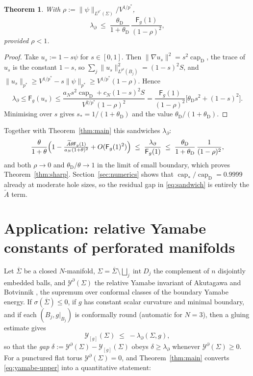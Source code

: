 \documentclass[11pt,reqno]{amsart}
\theoremstyle{plain}
\newtheorem{theorem}{Theorem}[section]
\theoremstyle{definition}
\newcommand{\aN}{a_N}
\newcommand{\cN}{c_N}
\newcommand{\pstar}{p^{*}}
\newcommand{\psharp}{p^{\sharp}}
\newcommand{\cpstar}{\operatorname{cap}_{*}}
\newcommand{\Fq}{\mathsf{F}}
\newcommand{\Y}{\mathcal{Y}}
\newcommand{\Yb}{\mathcal{Y}^{\partial}}
\newcommand{\Atil}{\widetilde{A}}
\begin{document}
\begin{theorem}
\label{thm:upper}
With $\rho:=\|\psi\|_{L^{\pstar}(\Sigma)}/V^{1/\pstar}$,
\[
  \lambda_\partial\;\le\;\frac{\theta_{\mathrm D}}{1+\theta_{\mathrm D}}\,
      \frac{\Fq_g(1)}{(1-\rho)^{2}} ,
\]
provided $\rho<1$.
\end{theorem}

\begin{proof}
Take $u_s:=1-s\psi$ for $s\in[0,1]$. Then
$\|\nabla u_s\|^2=s^2\operatorname{cap}_{\mathrm D}$, the trace of $u_s$ is the
constant $1-s$, so $\sum_j\|u_s\|^2_{L^{\psharp}(B_j)}=(1-s)^2S$, and
$\|u_s\|_{\pstar}\ge V^{1/\pstar}-s\|\psi\|_{\pstar}\ge V^{1/\pstar}(1-\rho)$.
Hence
\[
  \lambda_\partial\le\Fq_g(u_s)
  \le\frac{\aN s^2\operatorname{cap}_{\mathrm D}+\cN(1-s)^2S}
          {V^{2/\pstar}(1-\rho)^2}
  =\frac{\Fq_g(1)}{(1-\rho)^2}\bigl[\theta_{\mathrm D}s^2+(1-s)^2\bigr].
\]
Minimising over $s$ gives $s_*=1/(1+\theta_{\mathrm D})$ and the value
$\theta_{\mathrm D}/(1+\theta_{\mathrm D})$.
\end{proof}

Together with Theorem~\ref{thm:main} this sandwiches $\lambda_\partial$:
\begin{equation}
\label{eq:sandwich}
  \frac{\theta}{1+\theta}\Bigl(1-\tfrac{\Atil\theta\Fq_g(1)}{\aN(1+\theta)^2}
     +O(\Fq_g(1)^2)\Bigr)
  \;\le\;\frac{\lambda_\partial}{\Fq_g(1)}\;\le\;
  \frac{\theta_{\mathrm D}}{1+\theta_{\mathrm D}}\,\frac1{(1-\rho)^2},
\end{equation}
and both $\rho\to0$ and $\theta_{\mathrm D}/\theta\to1$ in the limit of small
boundary, which proves Theorem~\ref{thm:sharp}. Section~\ref{sec:numerics} shows
that $\cpstar/\operatorname{cap}_{\mathrm D}=0.9999$ already at moderate hole
sizes, so the residual gap in \eqref{eq:sandwich} is entirely the $\Atil$ term.

\section{Application: relative Yamabe constants of perforated manifolds}
\label{sec:yamabe}

Let $\overline\Sigma$ be a closed $N$-manifold, $\Sigma=\overline\Sigma\setminus
\bigsqcup_j\operatorname{int}D_j$ the complement of $n$ disjointly embedded balls,
and $\Yb(\Sigma)$ the relative Yamabe invariant of Akutagawa and Botvinnik
\cite{AkutagawaBotvinnik2002}, the supremum over conformal classes of the
boundary Yamabe energy. If $\sigma(\overline\Sigma)\le0$, if $g$ has constant
scalar curvature and minimal boundary, and if each $(B_j,g|_{B_j})$ is
conformally round (automatic for $N=3$), then a gluing estimate gives
\begin{equation}
\label{eq:yamabe-upper}
  \Y_{[g]}(\Sigma)\;\le\;-\lambda_\partial(\Sigma,g),
\end{equation}
so that the \emph{gap} $\delta:=\Yb(\Sigma)-\Y_{[g]}(\Sigma)$ obeys
$\delta\ge\lambda_\partial$ whenever $\Yb(\Sigma)\ge0$. For a punctured flat
torus $\Yb(\Sigma)=0$, and Theorem~\ref{thm:main} converts \eqref{eq:yamabe-upper}
into a quantitative statement:
\end{document}
